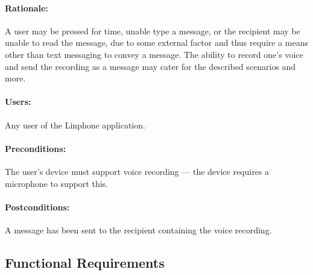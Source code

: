 \documentclass[11pt]{article}
\begin{document}
\paragraph{Rationale:} A user may be pressed for time, unable type a message, or the recipient may be unable to read the message, due to some external factor and thus require a means other than text messaging to convey a message. The ability to record one's voice and send the recording as a message may cater for the described scenarios and more.
\paragraph{Users:} Any user of the Linphone application.
\paragraph{Preconditions:} The user's device must support voice recording --- the device requires a microphone to support this.
\paragraph{{Postconditions:}} A message has been sent to the recipient containing the voice recording.

\subsection{Functional Requirements}
\end{document}
